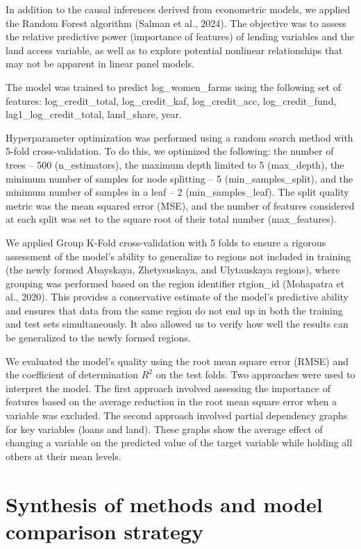﻿\documentclass[sn-mathphys-num]{sn-jnl}
\newcommand{\hl}[1]{#1}
\begin{document}
In addition to the causal inferences derived from econometric models, we
applied the Random Forest algorithm (\hl{Salman et al., 2024).} The
objective was to assess the relative predictive power (importance of
features) of lending variables and the land access variable, as well as
to explore potential nonlinear relationships that may not be apparent in
linear panel models.

The model was trained to predict log\_women\_farms using the following
set of features: log\_credit\_total, log\_credit\_kaf, log\_credit\_acc,
log\_credit\_fund, lag1\_log\_credit\_total, land\_share, year.

Hyperparameter optimization was performed using a random search method
with 5-fold cross-validation. To do this, we optimized the following:
the number of trees -- 500 (n\_estimators), the maximum depth limited to
5 (max\_depth), the minimum number of samples for node splitting -- 5
(min\_samples\_split), and the minimum number of samples in a leaf -- 2
(min\_samples\_leaf). The split quality metric was the mean squared
error (MSE), and the number of features considered at each split was set
to the square root of their total number (max\_features).

We applied Group K-Fold cross-validation with 5 folds to ensure a
rigorous assessment of the model's ability to generalize to regions not
included in training (the newly formed Abayskaya, Zhetysuskaya, and
Ulytauskaya regions), where grouping was performed based on the region
identifier rtgion\_id (\hl{Mohapatra et al., 2020)}. This provides a
conservative estimate of the model's predictive ability and ensures that
data from the same region do not end up in both the training and test
sets simultaneously. It also allowed us to verify how well the results
can be generalized to the newly formed regions.

We evaluated the model's quality using the root mean square error (RMSE)
and the coefficient of determination $R^2$ on the test folds. Two
approaches were used to interpret the model. The first approach involved
assessing the importance of features based on the average reduction in
the root mean square error when a variable was excluded. The second
approach involved partial dependency graphs for key variables (loans and
land). These graphs show the average effect of changing a variable on
the predicted value of the target variable while holding all others at
their mean levels.

\section{Synthesis of methods and model comparison strategy}
\end{document}
